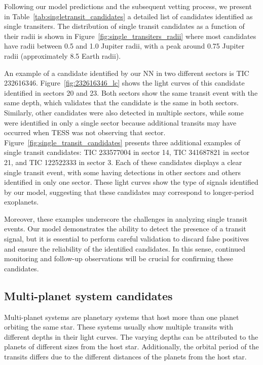 Following our model predictions and the subsequent vetting process, we present in Table~\ref{tab:singletransit_candidates} a detailed list of candidates identified as single transiters. The distribution of single transit candidates as a function of their radii is shown in Figure~\ref{fig:single_transiters_radii} where most candidates have radii between 0.5 and 1.0 Jupiter radii, with a peak around 0.75 Jupiter radii (approximately 8.5 Earth radii). 

An example of a candidate identified by our NN in two different sectors is TIC 232616346. Figure~\ref{fig:232616346_lc} shows the light curves of this candidate identified in sectors 20 and 23. Both sectors show the same transit event with the same depth, which validates that the candidate is the same in both sectors. Similarly, other candidates were also detected in multiple sectors, while some were identified in only a single sector because additional transits may have occurred when TESS was not observing that sector. Figure~\ref{fig:single_transit_candidates} presents three additional examples of single transit candidates: TIC 233577004 in sector 14, TIC 341687821 in sector 21, and TIC 122522333 in sector 3. Each of these candidates displays a clear single transit event, with some having detections in other sectors and others identified in only one sector. These light curves show the type of signals identified by our model, suggesting that these candidates may correspond to longer-period exoplanets. \par

Moreover, these examples underscore the challenges in analyzing single transit events. Our model demonstrates the ability to detect the presence of a transit signal, but it is essential to perform careful validation to discard false positives and ensure the reliability of the identified candidates. In this sense, continued monitoring and follow-up observations will be crucial for confirming these candidates.  \par

\subsection{Multi-planet system candidates}
\label{sec:multiplanet_candidates}
Multi-planet systems are planetary systems that host more than one planet orbiting the same star. These systems usually show multiple transits with different depths in their light curves. The varying depths can be attributed to the planets of different sizes from the host star. Additionally, the orbital period of the transits differs due to the different distances of the planets from the host star. 

